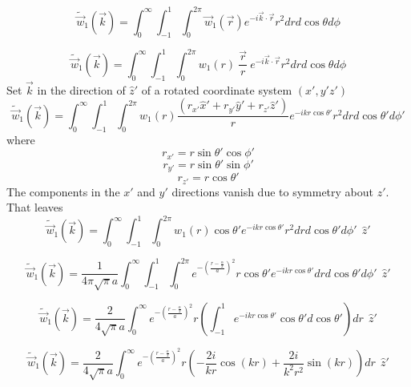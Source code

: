 \documentclass[letterpaper,twocolumn,amsmath,amssymb,prb]{revtex4-1}
\begin{document}
\begin{widetext}
\begin{equation}{\widetilde{\vec{w}}_1(\vec{k})=\int_{0}^{\infty}\int_{-1}^{1}\int_{0}^{2\pi}\vec{w}_1(\vec{r})e^{-i\vec{k}\cdot{\vec{r}}}r^2d{r}d{\cos\theta}d{\phi}}\end{equation}

\begin{equation}{\widetilde{\vec{w}}_1(\vec{k})=\int_{0}^{\infty}\int_{-1}^{1}\int_{0}^{2\pi}w_1(r){~}\frac{\vec{r}}{r}{~}e^{-i\vec{k}\cdot{\vec{r}}}r^2d{r}d{\cos\theta}d{\phi}}\end{equation}
Set $\vec{k}$ in the direction of $\hat{z}'$ of a rotated coordinate system $(x',y'z')$ 
\begin{equation}{\widetilde{\vec{w}}_1(\vec{k})=\int_{0}^{\infty}\int_{-1}^{1}\int_{0}^{2\pi}w_1(r)\frac{(r_{x'}\hat{x}'+r_{y'}\hat{y}'+r_{z'}\hat{z}')}{r}e^{-ikr\cos\theta'}r^2d{r}d{\cos\theta'}d{\phi'}}\end{equation}
where 
\begin{displaymath}{r_{x'}=r\sin\theta'\cos\phi'}\end{displaymath}
\begin{displaymath}{r_{y'}=r\sin\theta'\sin\phi'}\end{displaymath}
\begin{displaymath}{r_{z'}=r\cos\theta'}\end{displaymath} 
The components in the $x'$ and $y'$ directions vanish due to symmetry about $z'$. That leaves
\begin{equation}{\widetilde{\vec{w}}_1(\vec{k})=\int_{0}^{\infty}\int_{-1}^{1}\int_{0}^{2\pi}w_1(r)\cos{\theta}'e^{-ikr\cos\theta'}r^2d{r}d{\cos\theta'}d{\phi'}{~~}\hat{z}'}\end{equation}

\begin{equation}{\widetilde{\vec{w}}_1(\vec{k})=\frac{1}{4\pi\sqrt{\pi}a}\int_{0}^{\infty}\int_{-1}^{1}\int_{0}^{2\pi}e^{-\left(\frac{r-\frac{\alpha}{2}}{a}\right)^2}r\cos{\theta}'e^{-ikr\cos\theta'}d{r}d{\cos\theta'}d{\phi'}{~~}\hat{z}'}\end{equation}

\begin{equation}{\widetilde{\vec{w}}_1(\vec{k})=\frac{2}{4\sqrt{\pi}a}\int_{0}^{\infty}e^{-\left(\frac{r-\frac{\alpha}{2}}{a}\right)^2}r\left(\int_{-1}^{1}e^{-ikr\cos\theta'}\cos{\theta}'d{\cos\theta'}\right)d{r}{~~}\hat{z}'}\end{equation}

\begin{equation}{\widetilde{\vec{w}}_1(\vec{k})=\frac{2}{4\sqrt{\pi}a}\int_{0}^{\infty}e^{-\left(\frac{r-\frac{\alpha}{2}}{a}\right)^2}r\left(-\frac{2i}{kr}\cos(kr)+\frac{2i}{k^2r^2}\sin(kr)\right)d{r}{~~}\hat{z}'}\end{equation}


\end{widetext}
\end{document}
